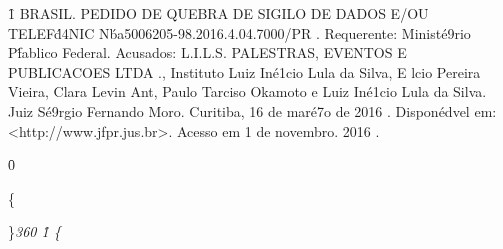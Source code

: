 {{\widctlpar\wrapdefault\aspalpha\aspnum\faauto\adjustright{} \rtlch{}  \ltrch{} \f1\cgrid{} {\rtlch{}  \ltrch{} \super{} 
\chftn }{\rtlch{}  \ltrch{}   }{\rtlch{}  \ltrch{}  BRASIL. }{\rtlch{}  \ltrch{}  
PEDIDO DE QUEBRA DE SIGILO DE DADOS E/OU TELEF\'d4NIC N\'ba5006205-98.2016.4.04.7000/PR}{\rtlch{}  \ltrch{}  . Requerente: Minist\'e9rio P\'fablico Federal. Acusados:}{\rtlch{} 
 \ltrch{}   }{\rtlch{}  \ltrch{}  L.I.L.S. PALESTRAS, EVENTOS E PUBLICACOES LTDA}{\rtlch{}  \ltrch{} 
 .,}{\rtlch{}  \ltrch{}   Instituto Luiz In\'e1cio Lula da Silva, }{\rtlch{}  \ltrch{} 
 E}{\rtlch{}  \ltrch{}  lcio Pereira Vieira, Clara Levin Ant, Paulo Tarciso Okamoto e Luiz In\'e1cio Lula da Silva. }{\rtlch{}  \ltrch{} 
  }{\rtlch{}  \ltrch{}  Juiz S\'e9rgio Fernando Moro. Curitiba, }{\rtlch{}  \ltrch{}  16}{
\rtlch{}  \ltrch{}   de }{\rtlch{}  \ltrch{}  mar\'e7o}{\rtlch{}  \ltrch{}   de 2016}{\rtlch{}  
\ltrch{}  .}{\rtlch{} \ai{} \ltrch{}   Dispon\'edvel em: <http://www.jfpr.jus.br>. Acesso em 1 de novembro. 2016}{\rtlch{} \ai{} \ltrch{} 
 .}{\rtlch{}  \ltrch{} \f0 
\par }}}\{\rtlch{}  \ltrch{}
\par \}\pard\plain \ltrpar\qj {}\sl360\widctlpar\wrapdefault\faauto{} \rtlch{}  \ltrch{} \f1\cgrid{} \{\rtlch{}
